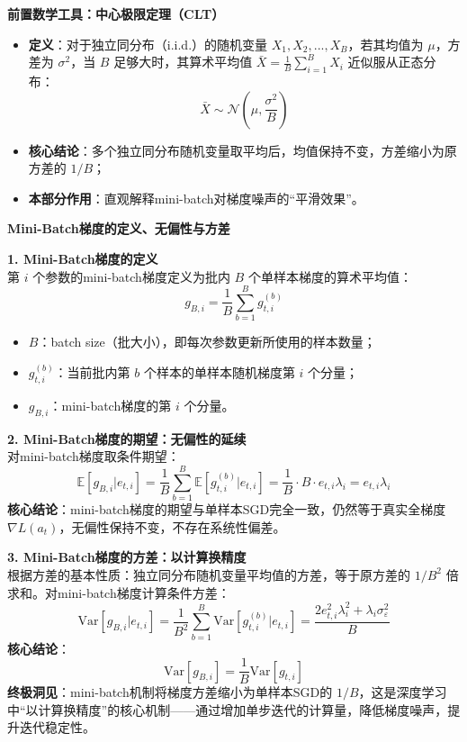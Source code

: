 \documentclass[10pt]{article}
\numberwithin{equation}{section}
\theoremstyle{plain}
\theoremstyle{definition}
\theoremstyle{remark}
\begin{document}
{\par\vspace{0.8ex}\noindent\normalsize\bfseries\color{secblue} 前置数学工具：中心极限定理（CLT）\par}
\begin{itemize}[leftmargin=*,nosep]
    \item \textbf{定义}：对于独立同分布（i.i.d.）的随机变量 $X_1, X_2, ..., X_B$，若其均值为 $\mu$，方差为 $\sigma^2$，当 $B$ 足够大时，其算术平均值 $\bar{X} = \frac{1}{B}\sum_{i=1}^B X_i$ 近似服从正态分布：
    \[ \displaystyle \bar{X} \sim \mathcal{N}\left( \mu, \frac{\sigma^2}{B} \right) \]
    \item \textbf{核心结论}：多个独立同分布随机变量取平均后，均值保持不变，方差缩小为原方差的 $1/B$；
    \item \textbf{本部分作用}：直观解释mini-batch对梯度噪声的“平滑效果”。
\end{itemize}

{\par\vspace{0.8ex}\noindent\normalsize\bfseries\color{secblue} Mini-Batch梯度的定义、无偏性与方差\par}
\textbf{1. Mini-Batch梯度的定义}\\
第 $i$ 个参数的mini-batch梯度定义为批内 $B$ 个单样本梯度的算术平均值：
\[ \displaystyle g_{B,i} = \frac{1}{B}\sum_{b=1}^B g_{t,i}^{(b)} \tag{35} \]
\begin{itemize}[leftmargin=*,nosep]
    \item $B$：batch size（批大小），即每次参数更新所使用的样本数量；
    \item $g_{t,i}^{(b)}$：当前批内第 $b$ 个样本的单样本随机梯度第 $i$ 个分量；
    \item $g_{B,i}$：mini-batch梯度的第 $i$ 个分量。
\end{itemize}

\textbf{2. Mini-Batch梯度的期望：无偏性的延续}\\
对mini-batch梯度取条件期望：
\[ \displaystyle \mathbb{E}[g_{B,i} | e_{t,i}] = \frac{1}{B}\sum_{b=1}^B \mathbb{E}[g_{t,i}^{(b)} | e_{t,i}] = \frac{1}{B} \cdot B \cdot e_{t,i}\lambda_i = e_{t,i}\lambda_i \tag{36} \]
\textbf{核心结论}：mini-batch梯度的期望与单样本SGD完全一致，仍然等于真实全梯度 $\nabla L(a_t)$，无偏性保持不变，不存在系统性偏差。

\textbf{3. Mini-Batch梯度的方差：以计算换精度}\\
根据方差的基本性质：独立同分布随机变量平均值的方差，等于原方差的 $1/B^2$ 倍求和。对mini-batch梯度计算条件方差：
\[ \displaystyle \text{Var}[g_{B,i} | e_{t,i}] = \frac{1}{B^2}\sum_{b=1}^B \text{Var}[g_{t,i}^{(b)} | e_{t,i}] = \frac{2e_{t,i}^2\lambda_i^2 + \lambda_i\sigma_\varepsilon^2}{B} \tag{37} \]
\textbf{核心结论}：
\[ \displaystyle \text{Var}[g_{B,i}] = \frac{1}{B}\text{Var}[g_{t,i}] \tag{38} \]
\textbf{终极洞见}：mini-batch机制将梯度方差缩小为单样本SGD的 $1/B$，这是深度学习中“以计算换精度”的核心机制——通过增加单步迭代的计算量，降低梯度噪声，提升迭代稳定性。
\end{document}
